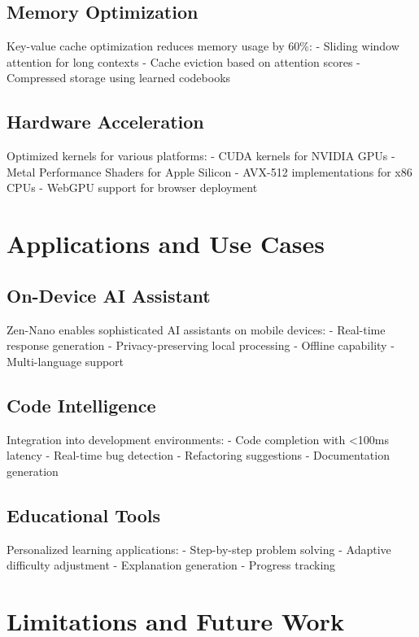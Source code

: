 \documentclass[11pt,a4paper]{article}
\begin{document}
\subsection{Memory Optimization}

Key-value cache optimization reduces memory usage by 60\%:
- Sliding window attention for long contexts
- Cache eviction based on attention scores
- Compressed storage using learned codebooks

\subsection{Hardware Acceleration}

Optimized kernels for various platforms:
- CUDA kernels for NVIDIA GPUs
- Metal Performance Shaders for Apple Silicon
- AVX-512 implementations for x86 CPUs
- WebGPU support for browser deployment

\section{Applications and Use Cases}

\subsection{On-Device AI Assistant}

Zen-Nano enables sophisticated AI assistants on mobile devices:
- Real-time response generation
- Privacy-preserving local processing
- Offline capability
- Multi-language support

\subsection{Code Intelligence}

Integration into development environments:
- Code completion with <100ms latency
- Real-time bug detection
- Refactoring suggestions
- Documentation generation

\subsection{Educational Tools}

Personalized learning applications:
- Step-by-step problem solving
- Adaptive difficulty adjustment
- Explanation generation
- Progress tracking

\section{Limitations and Future Work}
\end{document}
